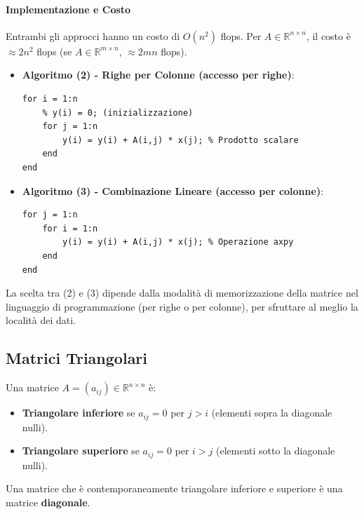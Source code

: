 \paragraph{Implementazione e Costo}
Entrambi gli approcci hanno un costo di $O(n^2)$ flops. Per $A \in \mathbb{R}^{n \times n}$, il costo è $\approx 2n^2$ flops (se $A \in \mathbb{R}^{m \times n}$, $\approx 2mn$ flops).

\begin{itemize}
    \item \textbf{Algoritmo (2) - Righe per Colonne (accesso per righe)}:
    \begin{lstlisting}[numbers=none, frame=none, basicstyle=\ttfamily]
for i = 1:n
    % y(i) = 0; (inizializzazione)
    for j = 1:n
        y(i) = y(i) + A(i,j) * x(j); % Prodotto scalare
    end
end
    \end{lstlisting}
    
    \item \textbf{Algoritmo (3) - Combinazione Lineare (accesso per colonne)}:
    \begin{lstlisting}[numbers=none, frame=none, basicstyle=\ttfamily]
% y = zeros(n,1); (inizializzazione)
for j = 1:n
    for i = 1:n
        y(i) = y(i) + A(i,j) * x(j); % Operazione axpy
    end
end
    \end{lstlisting}
\end{itemize}

La scelta tra (2) e (3) dipende dalla modalità di memorizzazione della matrice nel linguaggio di programmazione (per righe o per colonne), per sfruttare al meglio la località dei dati.


\subsection{Matrici Triangolari}
\begin{definition}
Una matrice $A=(a_{ij}) \in \mathbb{R}^{n \times n}$ è:
\begin{itemize}
    \item \textbf{Triangolare inferiore} se $a_{ij} = 0$ per $j > i$ (elementi sopra la diagonale nulli).
    \item \textbf{Triangolare superiore} se $a_{ij} = 0$ per $i > j$ (elementi sotto la diagonale nulli).
\end{itemize}
\end{definition}

\begin{osservazione}
Una matrice che è contemporaneamente triangolare inferiore e superiore è una matrice \textbf{diagonale}.
\end{osservazione}

